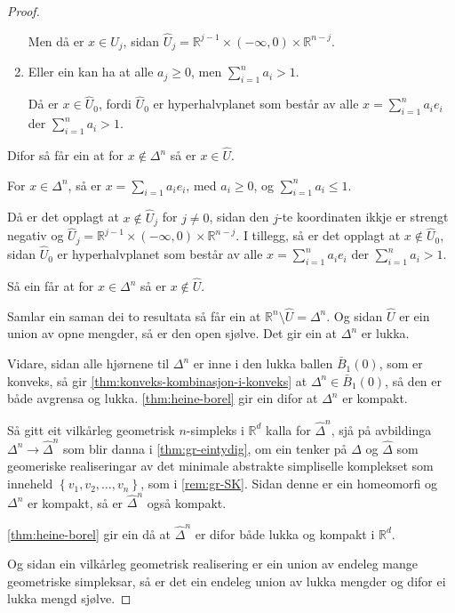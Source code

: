 \documentclass[a4paper, 12pt, norsk]{article}
\theoremstyle{plain}
\theoremstyle{definition}
\newcommand{\Rb}{\mathbb{R}}
\newcommand{\set}[1]{ \left\{ #1 \right\} } %
\begin{document}
\begin{proof}
\begin{enumerate}
{				Men då er \( x \in \hat{U}_j \), sidan \( \hat{U}_j = \Rb^{j-1}\times(-\infty, 0) \times \Rb^{n-j} \). }
  		\item { Eller ein kan ha at alle \( a_j \geq 0 \), men \( \sum_{i=1}^n a_i > 1 \). 
		
				 Då er \( x \in \hat{U}_0 \), fordi \( \hat{U}_0 \) er hyperhalvplanet som består av alle \( x = \sum_{i = 1}^n a_i e_i \) der \( \sum_{i = 1}^n a_i > 1 \). }
	\end{enumerate}

	Difor så får ein at for \( x \not\in \Delta^n \) så er \( x \in \hat{U} \).

	For \( x \in \Delta^n \), så er \( x = \sum_{i=1} a_i e_i \), med \( a_i \geq 0 \), og \( \sum_{i=1}^n a_i \leq 1 \).

	Då er det opplagt at \( x \not\in \hat{U}_j \) for \( j \neq 0 \), sidan den \( j \)-te koordinaten ikkje er strengt negativ og \( \hat{U}_j = \Rb^{j-1}\times(-\infty, 0) \times \Rb^{n-j} \). I tillegg, så er det opplagt at \( x \not\in \hat{U}_0 \), sidan \( \hat{U}_0 \) er hyperhalvplanet som består av alle \( x = \sum_{i = 1}^n a_i e_i \) der \( \sum_{i = 1}^n a_i > 1 \).

	Så ein får at for \( x \in \Delta^n \) så er \( x \not\in \hat{U} \).

	Samlar ein saman dei to resultata så får ein at \( \Rb^n \setminus \hat{U} = \Delta^n \). Og sidan \( \hat{U} \) er ein union av opne mengder, så er den open sjølve. Det gir ein at \( \Delta^n \) er lukka.

	Vidare, sidan alle hjørnene til \( \Delta^n \) er inne i den lukka ballen \( \bar{B}_{1}(0) \), som er konveks, så gir \autoref{thm:konveks-kombinasjon-i-konveks} at \( \Delta^n \in \bar{B}_{1}(0) \), så den er både avgrensa og lukka. \autoref{thm:heine-borel} gir ein difor at \( \Delta^n \) er kompakt.

	Så gitt eit vilkårleg geometrisk \( n \)-simpleks i \( \Rb^d \) kalla for \( \hat{\Delta}^n \), sjå på avbildinga \( \Delta^n \to \hat{\Delta}^n \) som blir danna i \autoref{thm:gr-eintydig}, om ein tenker på \( \Delta \) og \( \hat{\Delta} \) som geomeriske realiseringar av det minimale abstrakte simpliselle komplekset som inneheld \( \set{v_1, v_2, \dots, v_n} \), som i \autoref{rem:gr-SK}. Sidan denne er ein homeomorfi og \( \Delta^n \) er kompakt, så er \( \hat{\Delta}^n \) også kompakt.

	\autoref{thm:heine-borel} gir ein då at \( \hat{\Delta}^n \) er difor både lukka og kompakt i \( \Rb^d \).

	Og sidan ein vilkårleg geometrisk realisering er ein union av endeleg mange geometriske simpleksar, så er det ein endeleg union av lukka mengder og difor ei lukka mengd sjølve.
\end{proof}
\end{document}
